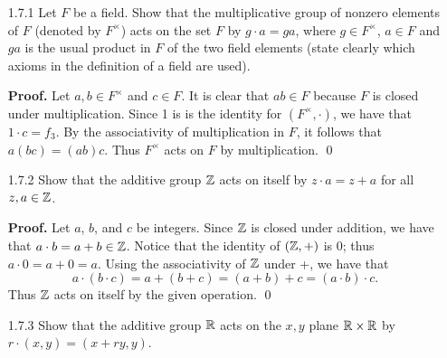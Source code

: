 \begin{enumerate}
   \item[1.7.1]   Let $F$ be a field. Show that the multiplicative group of
                  nonzero elements of $F$ (denoted by $F^\times$) acts on the
                  set $F$ by $g \cdot a = ga$, where $g \in F^\times$,
                  $a \in F$ and $ga$ is the usual product in $F$ of the two
                  field elements (state clearly which axioms in the definition
                  of a field are used).

      \textbf{Proof.} Let $a, b \in F^\times$ and $c \in F$. It is clear
      that $ab \in F$ because $F$ is closed under multiplication. Since 1 is
      is the identity for $(F^\times, \cdot)$, we have that $1 \cdot c = f_3$.
      By the associativity of multiplication in $F$, it follows that
      $a(bc) = (ab)c$. Thus $F^\times$ acts on $F$ by multiplication. \qed
   \item[1.7.2]   Show that the additive group $\mathbb{Z}$ acts on itself by
                  $z \cdot a = z + a$ for all $z, a \in \mathbb{Z}$.

      \textbf{Proof.} Let $a$, $b$, and $c$ be integers. Since $\mathbb{Z}$ is closed
      under addition, we have that $a \cdot b = a + b \in \mathbb{Z}$. Notice that the 
      identity of $(\mathbb{Z}, +)$ is 0; thus $a \cdot 0 = a + 0 = a$. Using the 
      associativity of $\mathbb{Z}$ under +, we have that
      $$a \cdot (b \cdot c) = a + (b + c) = (a + b) + c = (a \cdot b) \cdot c.$$
      Thus $\mathbb{Z}$ acts on itself by the given operation. \qed
   \item[1.7.3]   Show that the additive group $\mathbb{R}$ acts on the $x, y$ plane
                  $\mathbb{R} \times \mathbb{R}$ by $r \cdot (x, y) = (x + ry, y)$.


\end{enumerate}
